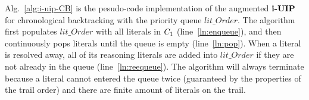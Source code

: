 Alg.~\ref{alg:i-uip-CB} is the pesudo-code implementation of the augmented $\textbf{i-UIP}$ for chronological backtracking with the priority queue $lit\_Order$. The algorithm first populates $lit\_Order$ with all literals in $C_{1}$ (line~\ref{ln:enqueue}), and then continuously pops literals until the queue is empty (line~\ref{ln:pop}). When a literal is resolved away, all of its reasoning literals are added into $lit\_Order$ if they are not already in the queue (line~\ref{ln:reequeue}). The algorithm will always terminate because a literal cannot entered the queue twice (guaranteed by the properties of the trail order) and there are finite amount of literals on the trail.
